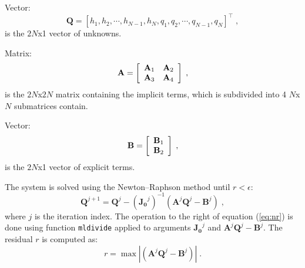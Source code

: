 \documentclass{deltares_report_elv}
\begin{document}
Vector:
\begin{equation}
\mathbf{Q}=[h_1, h_2, \cdots, h_{N-1}, h_N, q_1, q_2, \cdots, q_{N-1}, q_N]^{\intercal} \;,
\end{equation}
is the $2N$x1 vector of unknowns. 

Matrix:
\begin{equation}
\makebox[\textwidth][c]{$
		\mathbf{A}=\left[
		\begin{array}{cc}
  \mathbf{A}_{1} & \mathbf{A}_{2} \\
	\mathbf{A}_{3} & \mathbf{A}_{4} \\
 \end{array}\right] \;,
$} 
\end{equation}
is the $2N$x$2N$ matrix containing the implicit terms, which is subdivided into 4 $N$x$N$ submatrices contain.

Vector:
\begin{equation}
\makebox[\textwidth][c]{$
		\mathbf{B}=\left[
		\begin{array}{cc}
  \mathbf{B}_{1}\\
	\mathbf{B}_{2}\\
 \end{array}\right] \;,
$} 
\end{equation}
is the $2N$x1 vector of explicit terms. 

The system is solved using the Newton–Raphson method until $r<\epsilon$:
\begin{equation}
\label{eq:nr}
\mathbf{Q}^{j+1}=\mathbf{Q}^{j}-(\mathbf{J_0}^{j})^{-1}\left(\mathbf{A}^{j}\mathbf{Q}^{j}-\mathbf{B}^{j}\right) \;,
\end{equation}
where $j$ is the iteration index. The operation to the right of equation (\ref{eq:nr}) is done using function \texttt{mldivide} applied to arguments $\mathbf{J_0}^{j}$ and $\mathbf{A}^{j}\mathbf{Q}^{j}-\mathbf{B}^{j}$. The residual $r$ is computed as:
\begin{equation}
r=\max{\left|\left(\mathbf{A}^{j}\mathbf{Q}^{j}-\mathbf{B}^{j}\right)\right|} \;.
\end{equation}

\section{\codeFriction{}}
\label{sec:codeFriction}

\section{\codeSedTrans{}}
\label{sec:codeSedTrans}
\end{document}

